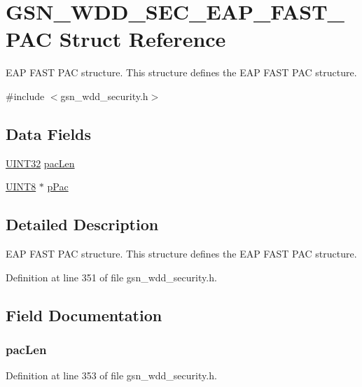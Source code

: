 \hypertarget{a00288}{
\section{GSN\_\-WDD\_\-SEC\_\-EAP\_\-FAST\_\-PAC Struct Reference}
\label{a00288}
}


EAP FAST PAC structure. This structure defines the EAP FAST PAC structure.  




{\ttfamily \#include $<$gsn\_\-wdd\_\-security.h$>$}

\subsection*{Data Fields}
\begin{DoxyCompactItemize}
\item 
\hyperlink{a00660_gae1e6edbbc26d6fbc71a90190d0266018}{UINT32} \hyperlink{a00288_a3c397e8b6b857afc72867203aee2ac5d}{pacLen}
\item 
\hyperlink{a00660_gab27e9918b538ce9d8ca692479b375b6a}{UINT8} $\ast$ \hyperlink{a00288_a1243a664ca4dd595185078f334740042}{pPac}
\end{DoxyCompactItemize}


\subsection{Detailed Description}
EAP FAST PAC structure. This structure defines the EAP FAST PAC structure. 

Definition at line 351 of file gsn\_\-wdd\_\-security.h.



\subsection{Field Documentation}
\hypertarget{a00288_a3c397e8b6b857afc72867203aee2ac5d}{
\subsubsection[{pacLen}]{ {\bf pacLen}}}
\label{a00288_a3c397e8b6b857afc72867203aee2ac5d}


Definition at line 353 of file gsn\_\-wdd\_\-security.h.

